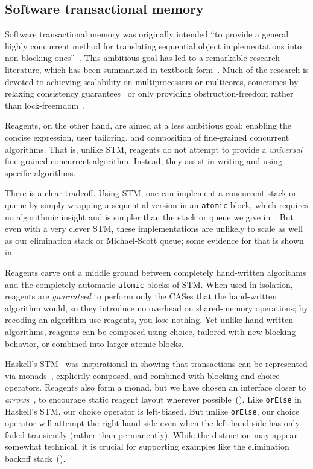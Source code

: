 \documentclass[preprint,nocopyrightspace]{sigplanconf}
\begin{document}
\subsection{Software transactional memory}
\label{sec:stm}

Software transactional memory was originally intended ``to provide a general
highly concurrent method for translating sequential object implementations
into non-blocking ones''~\cite{Shavit1997}.  This ambitious goal has led to a
remarkable research literature, which has been summarized in textbook
form~\cite{Larus2006}.  Much of the research is devoted to achieving
scalability on multiprocessors or multicores, sometimes by relaxing
consistency guarantees~\cite{?} or only providing obstruction-freedom rather
than lock-freemdom~\cite{Herlihy2003}.  %

Reagents, on the other hand, are aimed at a less ambitious goal: enabling the
concise expression, user tailoring, and composition of fine-grained concurrent
algorithms.  That is, unlike STM, reagents do not attempt to provide a
\emph{universal} fine-grained concurrent algorithm.  Instead, they assist in
writing and using specific algorithms.  

There is a clear tradeoff.  Using STM, one can implement a concurrent stack or
queue by simply wrapping a sequential version in an \lstinline{atomic} block,
which requires no algorithmic insight and is simpler than the stack or queue
we give in~.  But even with a very clever STM, these
implementations are unlikely to scale as well as our elimination stack or
Michael-Scott queue; some evidence for that is shown in~.

Reagents carve out a middle ground between completely hand-written algorithms
and the completely automatic \lstinline{atomic} blocks of STM.  When used in
isolation, reagents are \emph{guaranteed} to perform only the CASes that the
hand-written algorithm would, so they introduce no overhead on shared-memory
operations; by recoding an algorithm use reagents, you lose nothing. Yet unlike hand-written algorithms, reagents can be
composed using choice, tailored with new blocking behavior, or combined
into larger atomic blocks. %

Haskell's STM~\cite{Harris2005a} was inspirational in showing that
transactions can be represented via monads~\cite{PeytonJones1993}, explicitly
composed, and combined with blocking and choice operators.  Reagents also form
a monad, but we have chosen an interface closer to
\emph{arrows}~\cite{Hughes2000}, to encourage static reagent layout wherever
possible~().  Like \lstinline{orElse} in Haskell's STM, our
choice operator is left-biased.  But unlike \lstinline{orElse}, our choice
operator will attempt the right-hand side even when the left-hand side has
only failed transiently (rather than permanently).  While the distinction may
appear somewhat technical, it is crucial for supporting examples like the
elimination backoff stack~().
\end{document}

